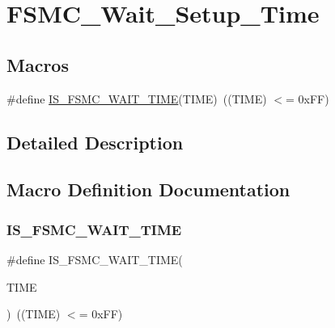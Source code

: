 \hypertarget{group___f_s_m_c___wait___setup___time}{}\section{F\+S\+M\+C\+\_\+\+Wait\+\_\+\+Setup\+\_\+\+Time}
\label{group___f_s_m_c___wait___setup___time}
\subsection*{Macros}
\begin{DoxyCompactItemize}
\item 
\#define \mbox{\hyperlink{group___f_s_m_c___wait___setup___time_ga5c0efc48afb916ceff32868940f81613}{I\+S\+\_\+\+F\+S\+M\+C\+\_\+\+W\+A\+I\+T\+\_\+\+T\+I\+ME}}(T\+I\+ME)~((T\+I\+ME) $<$= 0x\+F\+F)
\end{DoxyCompactItemize}


\subsection{Detailed Description}


\subsection{Macro Definition Documentation}
\mbox{\label{group___f_s_m_c___wait___setup___time_ga5c0efc48afb916ceff32868940f81613}} 
\subsubsection{\texorpdfstring{IS\_FSMC\_WAIT\_TIME}{IS\_FSMC\_WAIT\_TIME}}
{\footnotesize\ttfamily \#define I\+S\+\_\+\+F\+S\+M\+C\+\_\+\+W\+A\+I\+T\+\_\+\+T\+I\+ME(\begin{DoxyParamCaption}\item[{}]{T\+I\+ME }\end{DoxyParamCaption})~((T\+I\+ME) $<$= 0x\+F\+F)}

